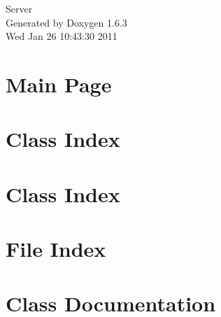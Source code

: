 \documentclass[a4paper]{book}
\begin{document}
\hypersetup{pageanchor=false}
\begin{titlepage}
\vspace*{7cm}
\begin{center}
{\Large Server }\\
\vspace*{1cm}
{\large Generated by Doxygen 1.6.3}\\
\vspace*{0.5cm}
{\small Wed Jan 26 10:43:30 2011}\\
\end{center}
\end{titlepage}
\clearemptydoublepage
{}
\tableofcontents
\clearemptydoublepage
{}
\hypersetup{pageanchor=true}
\chapter{Main Page}
\label{index}\hypertarget{index}{}
\chapter{Class Index}

\chapter{Class Index}

\chapter{File Index}

\chapter{Class Documentation}





























\end{document}
